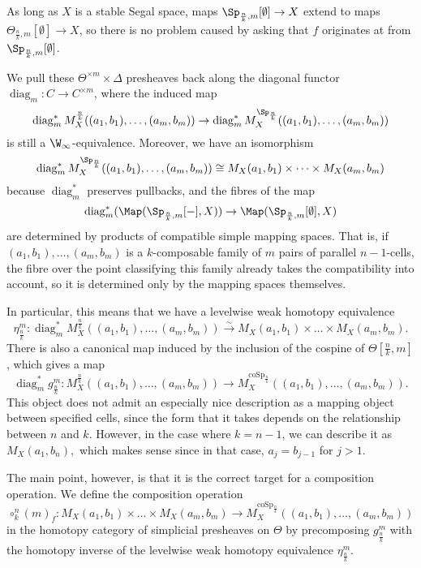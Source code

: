 \begin{note} As long as \(X\) is a stable Segal space, maps \(\Sp_{\frac{n}{k},m}[\emptyset]\to X\) extend to maps \(\Theta_{\frac{n}{k},m}[\emptyset]\to X\), so there is no problem caused by asking that \(f\) originates at  from \(\Sp_{\frac{n}{k},m}[\emptyset]\).
\end{note}
We pull these \(\Theta^{\times m} \times \Delta\) presheaves back along the diagonal functor \(\operatorname{diag}_m:C\to C^{\times m}\), where the induced map 
\[\operatorname{diag}_m^* M^{\frac{n}{k}}_X((a_1,b_1),\dots,(a_m,b_m))\to \operatorname{diag}_m^* M^{\Sp_{\frac{n}{k}}}_X((a_1,b_1),\dots,(a_m,b_m))\] is still a \(\W_\infty\)-equivalence.  Moreover, we have an isomorphism \[\operatorname{diag}_m^* M^{\Sp_{\frac{n}{k}}}_X((a_1,b_1),\dots,(a_m,b_m))\cong M_X(a_1,b_1)\times \dots \times M_X(a_m,b_m)\] because \(\operatorname{diag}_m^*\) preserves pullbacks, and the fibres of the map \[\operatorname{diag}_m^*(\Map(\Sp_{\frac{n}{k},m}[-],X))\to \Map(\Sp_{\frac{n}{k},m}[\emptyset],X)\] are determined by products of compatible simple mapping spaces.  That is, if \((a_1,b_1),\dots,(a_m,b_m)\) is a \(k\)-composable family of \(m\) pairs of parallel \(n-1\)-cells, the fibre over the point classifying this family already takes the compatibility into account, so it is determined only by the mapping spaces themselves.

In particular, this means that we have a levelwise weak homotopy equivalence \[\eta^m_{\frac{n}{k}}:\operatorname{diag}_m^* M^{\frac{n}{k}}_X((a_1,b_1),\dots,(a_m,b_m))\xrightarrow{\sim} M_X(a_1,b_1)\times \dots \times M_X(a_m,b_m).\] There is also a canonical map induced by the inclusion of the cospine of \(\Theta[\frac{n}{k},m]\), which gives a map \[\operatorname{diag}_m^* g^m_{\frac{n}{k}}:M^{\frac{n}{k}}_X((a_1,b_1),\dots,(a_m,b_m)) \to M^{\operatorname{coSp}_{\frac{n}{k}}}_X((a_1,b_1),\dots,(a_m,b_m)).\]  This object does not admit an especially nice description as a mapping object between specified cells, since the form that it takes depends on the relationship between \(n\) and \(k\).  However, in the case where \(k=n-1\), we can describe it as \(M_X(a_1,b_n),\) which makes sense since in that case, \(a_j=b_{j-1}\) for \(j>1\).  

The main point, however, is that it is the correct target for a composition operation.  We define the composition operation \[\circ^n_k(m)_f:M_X(a_1,b_1)\times \dots \times M_X(a_m,b_m) \to M^{\operatorname{coSp}_{\frac{n}{k}}}_X((a_1,b_1),\dots,(a_m,b_m))\] in the homotopy category of simplicial presheaves on \(\Theta\) by precomposing \(g^m_{\frac{n}{k}}\) with the homotopy inverse of the levelwise weak homotopy equivalence \(\eta^m_{\frac{n}{k}}\).     

